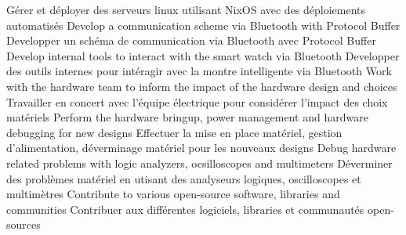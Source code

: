                     {Gérer et déployer des serveurs linux utilisant NixOS avec des déploiements automatisés}
                \resumeItemEnFr
                    {Develop a communication scheme via Bluetooth with Protocol Buffer}
                    {Developper un schéma de communication via Bluetooth avec Protocol Buffer}
                \resumeItemEnFr
                    {Develop internal tools to interact with the smart watch via Bluetooth}
                    {Developper des outils internes pour intéragir avec la montre intelligente via Bluetooth}
                \resumeItemEnFr
                    {Work with the hardware team to inform the impact of the hardware design and choices}
                    {Travailler en concert avec l'équipe électrique pour considérer l'impact des choix matériels}
                \resumeItemEnFr
                    {Perform the hardware bringup, power management and hardware debugging for new designs}
                    {Effectuer la mise en place matériel, gestion d'alimentation, déverminage matériel pour les nouveaux designs}
                \resumeItemEnFr
                    {Debug hardware related problems with logic analyzers, ocsilloscopes and multimeters}
                    {Déverminer des problèmes matériel en utisant des analyseurs logiques, oscilloscopes et multimètres}
                \resumeItemEnFr
                    {Contribute to various open-source software, libraries and communities}
                    {Contribuer aux différentes logiciels, libraries et communautés open-sources}
            \resumeItemListEnd
    \resumeSubHeadingListEnd

